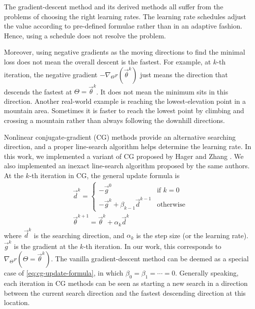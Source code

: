 
The gradient-descent method and its derived methods all suffer from the problems of choosing the right learning rates.
The learning rate schedules adjust the value according to pre-defined formulae rather than in an adaptive fashion.
Hence, using a schedule does not resolve the problem.

Moreover, using negative gradients as the moving directions to find the minimal loss does not mean the overall descent is the fastest.
For example, at $k$-th iteration, the negative gradient $- \nabla_{\Theta} r(\vec{\theta}^k)$ just means the direction that descends the fastest at $\Theta=\vec{\theta}^k$.
It does not mean the minimum sits in this direction.
Another real-world example is reaching the lowest-elevation point in a mountain area.
Sometimes it is faster to reach the lowest point by climbing and crossing a mountain rather than always following the downhill directions.

Nonlinear conjugate-gradient (CG) methods provide an alternative searching direction, and a proper line-search algorithm helps determine the learning rate.
In this work, we implemented a variant of CG proposed by Hager and Zhang \cite{hager_new_2005,hager_survey_2006,hager_algorithm_2006}.
We also implemented an inexact line-search algorithm proposed by the same authors.
At the $k$-th iteration in CG, the general update formula is
\begin{equation}\label{eq:cg-update-formula}
    \begin{aligned}
        &\vec{d}^k = 
        \left\{
            \begin{array}{ll}
                -\vec{g}^0 & \text{if\ }k = 0 \\
                -\vec{g}^k + \beta_{k-1}\vec{d}^{k-1} & \text{otherwise}
            \end{array}
        \right. \\
        &\vec{\theta}^{k+1} = \vec{\theta}^k + \alpha_k \vec{d}^k
    \end{aligned}
\end{equation}
where $\vec{d}^k$ is the searching direction, and $\alpha_k$ is the step size (or the learning rate).
$\vec{g}^k$ is the gradient at the $k$-th iteration.
In our work, this corresponds to $\nabla_{\Theta} r(\Theta=\vec{\theta}^k)$.
The vanilla gradient-descent method can be deemed as a special case of \eqref{eq:cg-update-formula}, in which $\beta_0=\beta_1=\cdots=0$.
Generally speaking, each iteration in CG methods can be seen as starting a new search in a direction between the current search direction and the fastest descending direction at this location.

